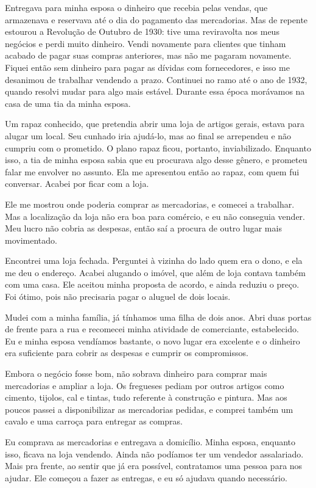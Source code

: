 Entregava para minha esposa o dinheiro que recebia pelas vendas, que
armazenava e reservava até o dia do pagamento das mercadorias. Mas de repente estourou a
Revolução de Outubro de 1930: tive uma reviravolta nos meus negócios
e perdi muito dinheiro. Vendi novamente para clientes que tinham acabado de
pagar suas compras anteriores, mas não me pagaram novamente. Fiquei então sem
dinheiro para pagar as dívidas com fornecedores, e isso me desanimou de trabalhar vendendo a prazo.
Continuei no ramo até o ano de 1932, quando resolvi mudar para algo mais estável. Durante essa época morávamos na casa de uma tia da minha esposa. 

Um rapaz conhecido, que pretendia abrir uma loja de artigos gerais, estava para alugar um
local. Seu cunhado iria ajudá-lo, mas ao final se arrependeu e não cumpriu com
o prometido. O plano rapaz ficou, portanto, inviabilizado. Enquanto isso, a tia de 
minha esposa sabia que eu procurava algo desse gênero, e prometeu falar me envolver no assunto. 
Ela me apresentou então ao rapaz, com quem fui conversar. Acabei por ficar com a loja. 

Ele me mostrou onde poderia comprar as mercadorias, e comecei a trabalhar. 
Mas a localização da loja não era
boa para comércio, e eu não conseguia vender. Meu lucro não cobria as despesas, 
então saí a procura de outro lugar mais movimentado.

Encontrei uma loja fechada. Perguntei à vizinha do lado quem era o dono, e ela me deu o 
endereço. Acabei alugando o imóvel, que além de loja contava também com uma casa. Ele aceitou minha 
proposta de acordo, e ainda reduziu o preço. Foi ótimo, pois não precisaria pagar o aluguel de dois locais. 

Mudei com a minha família, já tínhamos uma filha de dois anos. Abri
duas portas de frente para a rua e recomecei minha atividade de
comerciante, estabelecido. Eu e minha esposa vendíamos bastante,
o novo lugar era excelente e o dinheiro era suficiente
para cobrir as despesas e cumprir os compromissos.

Embora o negócio fosse bom, não sobrava dinheiro para comprar mais
mercadorias e ampliar a loja. Os fregueses pediam por outros artigos como 
cimento, tijolos, cal e tintas, tudo referente à construção e
pintura. Mas aos poucos passei a disponibilizar as mercadorias pedidas, e
comprei também um cavalo e uma carroça para entregar as compras.

Eu comprava as mercadorias e entregava a domicílio. Minha esposa,
enquanto isso, ficava na loja vendendo. Ainda não podíamos ter um
vendedor assalariado. Mais pra frente, ao sentir que já era possível, 
contratamos uma pessoa para nos ajudar. Ele começou a fazer
as entregas, e eu só ajudava quando necessário.

